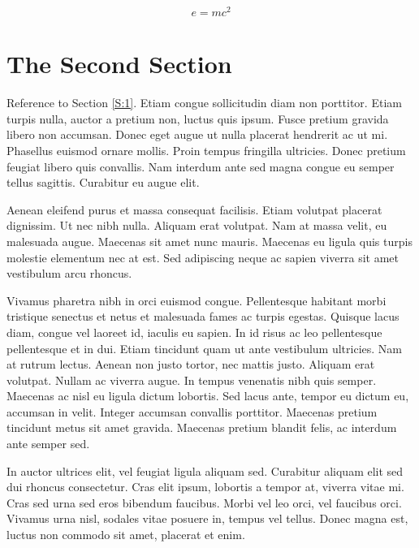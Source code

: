 \documentclass[preprint,12pt]{elsarticle}
\begin{document}
\begin{equation}
\label{eq:emc}
e = mc^2
\end{equation}

\section{The Second Section}
\label{S:2}

Reference to Section \ref{S:1}. Etiam congue sollicitudin diam non porttitor. Etiam turpis nulla, auctor a pretium non, luctus quis ipsum. Fusce pretium gravida libero non accumsan. Donec eget augue ut nulla placerat hendrerit ac ut mi. Phasellus euismod ornare mollis. Proin tempus fringilla ultricies. Donec pretium feugiat libero quis convallis. Nam interdum ante sed magna congue eu semper tellus sagittis. Curabitur eu augue elit.

Aenean eleifend purus et massa consequat facilisis. Etiam volutpat placerat dignissim. Ut nec nibh nulla. Aliquam erat volutpat. Nam at massa velit, eu malesuada augue. Maecenas sit amet nunc mauris. Maecenas eu ligula quis turpis molestie elementum nec at est. Sed adipiscing neque ac sapien viverra sit amet vestibulum arcu rhoncus.

Vivamus pharetra nibh in orci euismod congue. Pellentesque habitant morbi tristique senectus et netus et malesuada fames ac turpis egestas. Quisque lacus diam, congue vel laoreet id, iaculis eu sapien. In id risus ac leo pellentesque pellentesque et in dui. Etiam tincidunt quam ut ante vestibulum ultricies. Nam at rutrum lectus. Aenean non justo tortor, nec mattis justo. Aliquam erat volutpat. Nullam ac viverra augue. In tempus venenatis nibh quis semper. Maecenas ac nisl eu ligula dictum lobortis. Sed lacus ante, tempor eu dictum eu, accumsan in velit. Integer accumsan convallis porttitor. Maecenas pretium tincidunt metus sit amet gravida. Maecenas pretium blandit felis, ac interdum ante semper sed.

In auctor ultrices elit, vel feugiat ligula aliquam sed. Curabitur aliquam elit sed dui rhoncus consectetur. Cras elit ipsum, lobortis a tempor at, viverra vitae mi. Cras sed urna sed eros bibendum faucibus. Morbi vel leo orci, vel faucibus orci. Vivamus urna nisl, sodales vitae posuere in, tempus vel tellus. Donec magna est, luctus non commodo sit amet, placerat et enim.

\end{document}
